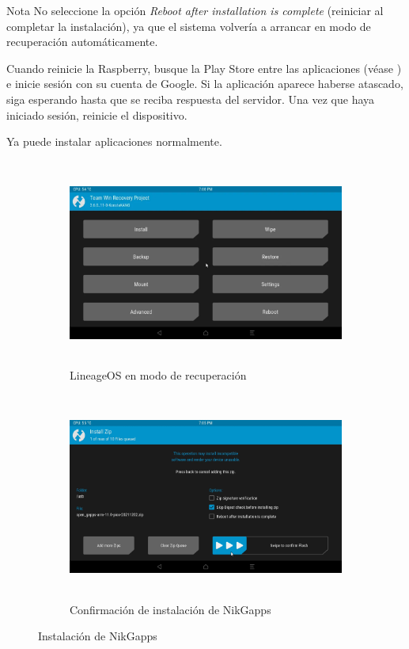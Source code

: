 \documentclass[letterpaper,10.5pt]{article}
\begin{document}
\medskip{}
\begin{greenbox}{Nota}
	No seleccione la opción \emph{Reboot after installation is complete} (reiniciar al completar la instalación), ya que el sistema volvería  a arrancar en modo de recuperación automáticamente.
\end{greenbox}
\medskip{}

Cuando reinicie la Raspberry, busque la Play Store entre las aplicaciones (véase ) e inicie sesión con su cuenta de Google.
Si la aplicación aparece haberse atascado, siga esperando hasta que se reciba respuesta del servidor.
Una vez que haya iniciado sesión, reinicie el dispositivo.

Ya puede instalar aplicaciones normalmente.

\begin{figure}[H]
	\centering%
	\begin{subfigure}[b]{0.5\linewidth}
		\centering
		\includegraphics[width=0.9\linewidth,height=68mm,keepaspectratio]{img/p02-05-recovery-mode.png} %
		\caption{LineageOS en modo de recuperación}
		\label{fig:recovery-mode} %
	\end{subfigure}%
	\begin{subfigure}[b]{0.5\linewidth}
		\centering
		\includegraphics[width=0.9\linewidth,height=68mm,keepaspectratio]{img/p02-05-nikgapps-install.png} %
		\caption{Confirmación de instalación de NikGapps}
		\label{fig:nikgapps-install-confirm} %
	\end{subfigure}
	\caption{Instalación de NikGapps}
	\label{fig:nikgapps-install} %
\end{figure}
\end{document}
